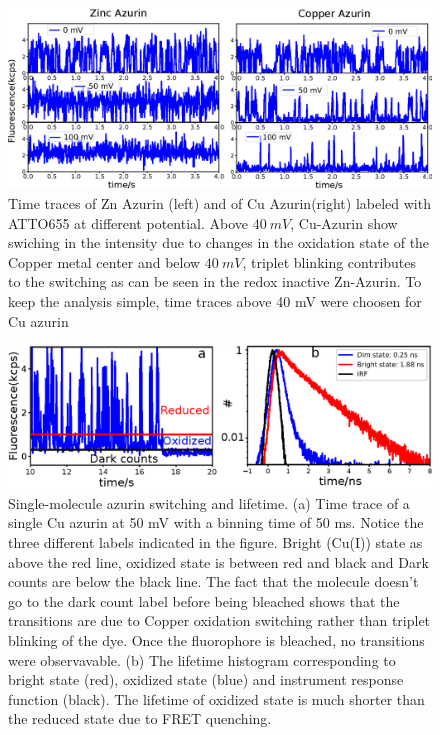 \documentclass[11pt,a4paper,onecolumn]{article}
\begin{document}
\begin{figure}
  \centering
  \includegraphics[width=\textwidth,keepaspectratio]{SI_timetrace_Zn_Cu.eps}
  \makeatletter
  \renewcommand{\fnum@figure}{\figurename~S\thefigure}
  \makeatother
  \caption{Time traces of Zn Azurin (left) and of Cu Azurin(right) labeled with ATTO655 at different potential.  Above $40~mV$, Cu-Azurin show swiching in the intensity due to changes in the oxidation state of the Copper metal center and below $40~mV$, triplet blinking contributes to the switching as can be seen in the redox inactive Zn-Azurin. To keep the analysis simple, time traces above 40 mV were choosen for Cu azurin}
  \label{SIfig:tracecomparision}
\end{figure}
\begin{figure}
  \centering
  \includegraphics{lifetime.eps}
  \makeatletter
  \renewcommand{\fnum@figure}{\figurename~S\thefigure
}  \makeatother
  \caption{Single-molecule azurin switching and lifetime. (a) Time trace of a single Cu azurin at 50 mV with a binning time of 50 ms. Notice the three different labels indicated in the figure. Bright (Cu(I)) state as above the red line, oxidized state is between red and black and Dark counts are below the black line. The fact that the molecule doesn't go to the dark count label before being bleached shows that the transitions are due to Copper oxidation switching rather than triplet blinking of the dye. Once the fluorophore is bleached, no transitions were observavable. (b) The lifetime histogram corresponding to bright state (red), oxidized state (blue) and instrument response function (black). The lifetime of oxidized state is much shorter than the reduced state due to FRET quenching.}
  \label{SIfig: lifetime}
\end{figure}
\end{document}

